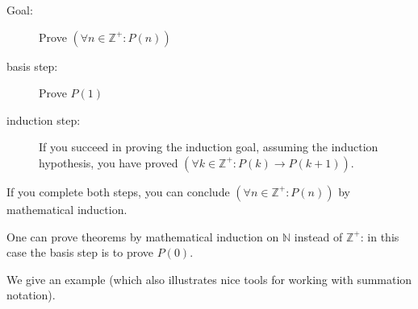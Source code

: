 \documentclass[12pt]{article}
\begin{document}
\begin{description}

\item[Goal:]  Prove $(\forall n \in {\mathbb Z}^+:P(n))$

\item[basis step:]  Prove $P(1)$

\item[induction step:]


If you succeed in proving the induction goal, assuming the induction hypothesis, you have proved $(\forall k \in {\mathbb Z}^+:P(k) \rightarrow P(k+1))$.



\end{description}
If you complete both steps, you can conclude $(\forall n \in {\mathbb Z}^+:P(n))$
 by mathematical induction.

One can prove theorems by mathematical induction on ${\mathbb N}$ instead of ${\mathbb Z}^+$:  in this case the basis step is to prove $P(0)$.

We give an example (which also illustrates nice tools for working with summation notation).
\end{document}
